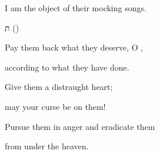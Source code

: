 {\par }{\Q I
am the object of their mocking songs.
\par }{\SH ת ({})
\par }{\Q {}Pay them back what they deserve, O
{},
\par }{\Q according to what they have done.
\par }{\Q {}Give
them
a distraught
heart;
\par }{\Q may your curse
be on them!
\par }{\Q {}Pursue
them in anger
and eradicate
them
\par }{\Q from under
the
{}
heaven.

\par }
